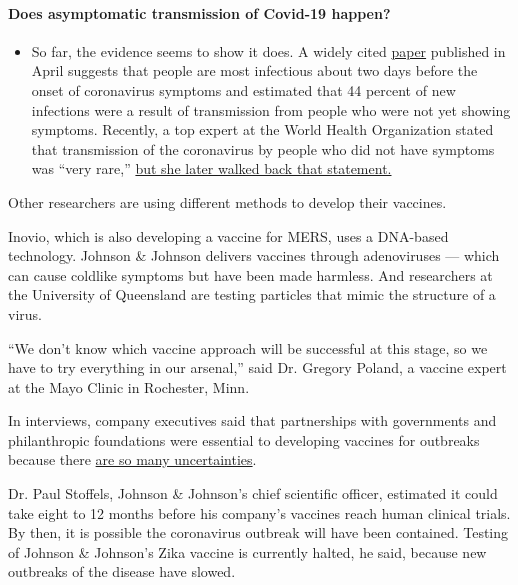 \begin{itemize}
{  \paragraph{Does asymptomatic transmission of Covid-19
  happen?}\label{does-asymptomatic-transmission-of-covid-19-happen}}

  \begin{itemize}
  \tightlist
  \item
    So far, the evidence seems to show it does. A widely cited
    \href{https://www.nature.com/articles/s41591-020-0869-5}{paper}
    published in April suggests that people are most infectious about
    two days before the onset of coronavirus symptoms and estimated that
    44 percent of new infections were a result of transmission from
    people who were not yet showing symptoms. Recently, a top expert at
    the World Health Organization stated that transmission of the
    coronavirus by people who did not have symptoms was ``very rare,''
    \href{https://www.nytimes.com/2020/06/09/world/coronavirus-updates.html?action=click\&pgtype=Article\&state=default\&region=MAIN_CONTENT_3\&context=storylines_faq\#link-1f302e21}{but
    she later walked back that statement.}
  \end{itemize}
\end{itemize}

Other researchers are using different methods to develop their vaccines.

Inovio, which is also developing a vaccine for MERS, uses a DNA-based
technology. Johnson \& Johnson delivers vaccines through adenoviruses
--- which can cause coldlike symptoms but have been made harmless. And
researchers at the University of Queensland are testing particles that
mimic the structure of a virus.

``We don't know which vaccine approach will be successful at this stage,
so we have to try everything in our arsenal,'' said Dr. Gregory Poland,
a vaccine expert at the Mayo Clinic in Rochester, Minn.

In interviews, company executives said that partnerships with
governments and philanthropic foundations were essential to developing
vaccines for outbreaks because there
\href{https://www.nytimes.com/2014/10/24/health/without-lucrative-market-potential-ebola-vaccine-was-shelved-for-years.html}{are
so many uncertainties}.

Dr. Paul Stoffels, Johnson \& Johnson's chief scientific officer,
estimated it could take eight to 12 months before his company's vaccines
reach human clinical trials. By then, it is possible the coronavirus
outbreak will have been contained. Testing of Johnson \& Johnson's Zika
vaccine is currently halted, he said, because new outbreaks of the
disease have slowed.

